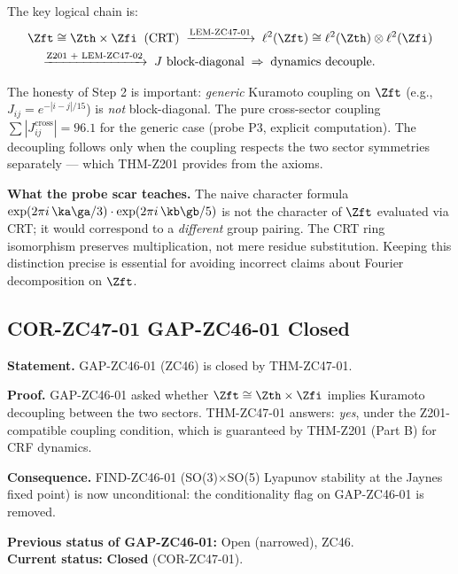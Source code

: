 \documentclass[12pt, a4paper]{article}
\begin{document}
\begin{derivedbox}[title={Commentary on THM-ZC47-01}]
The key logical chain is:
\begin{align*}
  &\Zft \cong \Zth \times \Zfi \;\;(\text{CRT})
  \;\xrightarrow{\text{LEM-ZC47-01}}\;
  \ell^2(\Zft) \cong \ell^2(\Zth) \otimes \ell^2(\Zfi)\\
  &\quad\xrightarrow{\text{Z201 + LEM-ZC47-02}}\;
  J \text{ block-diagonal}
  \;\Rightarrow\;
  \text{dynamics decouple}.
\end{align*}

The honesty of Step 2 is important: \emph{generic} Kuramoto
coupling on $\Zft$ (e.g., $J_{ij} = e^{-|i-j|/15}$) is
\emph{not} block-diagonal.
The pure cross-sector coupling $\sum|J_{ij}^{\text{cross}}| = 96.1$
for the generic case (probe P3, explicit computation).
The decoupling follows only when the coupling respects the two
sector symmetries separately --- which THM-Z201 provides from
the axioms.

\textbf{What the probe scar teaches.}
The naive character formula
$\exp(2\pi i\,\ka\ga/3)\cdot\exp(2\pi i\,\kb\gb/5)$
is not the character of $\Zft$ evaluated via CRT; it would correspond
to a \emph{different} group pairing.
The CRT ring isomorphism preserves multiplication, not mere
residue substitution.
Keeping this distinction precise is essential for avoiding
incorrect claims about Fourier decomposition on $\Zft$.
\end{derivedbox}

\subsection{COR-ZC47-01 \quad GAP-ZC46-01 Closed}
\label{sec:cor01}


\begin{formalbox}[title={COR-ZC47-01: GAP-ZC46-01 Closed
  $\Rightarrow$ FIND-ZC46-01 Unconditional}]
\textbf{Statement.}
GAP-ZC46-01 (ZC46) is closed by THM-ZC47-01.

\textbf{Proof.}
GAP-ZC46-01 asked whether $\Zft \cong \Zth \times \Zfi$
implies Kuramoto decoupling between the two sectors.
THM-ZC47-01 answers: \emph{yes}, under the Z201-compatible
coupling condition, which is guaranteed by THM-Z201 (Part B)
for CRF dynamics.

\textbf{Consequence.}
FIND-ZC46-01 (SO(3)$\times$SO(5) Lyapunov stability at the Jaynes
fixed point) is now unconditional: the conditionality flag
on GAP-ZC46-01 is removed.

\textbf{Previous status of GAP-ZC46-01:} Open (narrowed), ZC46.\\
\textbf{Current status:} \textbf{Closed} (COR-ZC47-01).
\end{formalbox}
\end{document}
